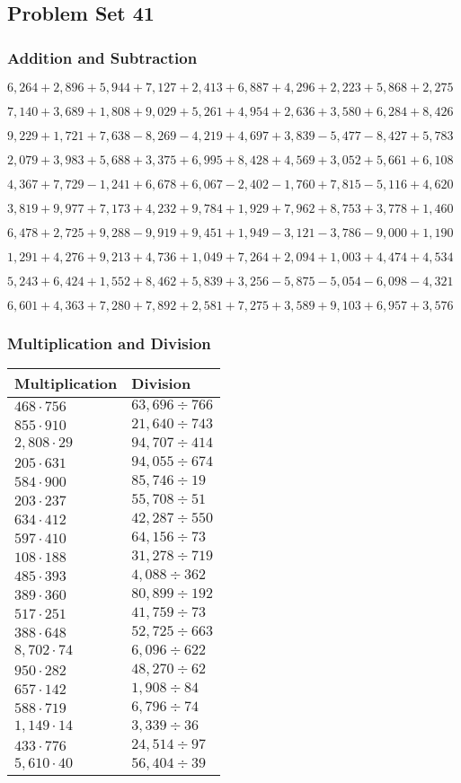\hypertarget{problem-set-41-3}{%
\subsection{Problem Set 41}\label{problem-set-41-3}}

\hypertarget{addition-and-subtraction-203}{%
\subsubsection{Addition and
Subtraction}\label{addition-and-subtraction-203}}

\(6,264+2,896+5,944+7,127+2,413+6,887+4,296+2,223+5,868+ 2,275\)

\(7,140+3,689+1,808+9,029+5,261+4,954+2,636+3,580+6,284+8,426\)

\(9,229+1,721+7,638-8,269-4,219+4,697+3,839-5,477-8,427+5,783\)

\(2,079+3,983+5,688+3,375+6,995+8,428+4,569+3,052+5,661+6,108\)

\(4,367+7,729-1,241+6,678+6,067-2,402-1,760+7,815-5,116+4,620\)

\(3,819+9,977+7,173+4,232+9,784+1,929+7,962+8,753+3,778+1,460\)

\(6,478+2,725+9,288-9,919+9,451+1,949-3,121-3,786-9,000+1,190\)

\(1,291+4,276+9,213+4,736+1,049+7,264+2,094+1,003+4,474+4,534\)

\(5,243+6,424+1,552+8,462+5,839+3,256-5,875-5,054-6,098-4,321\)

\(6,601+4,363+7,280+7,892+2,581+7,275+3,589+9,103+6,957+3,576\)

\hypertarget{multiplication-and-division-202}{%
\subsubsection{Multiplication and
Division}\label{multiplication-and-division-202}}

\begin{longtable}[]{@{}ll@{}}
\toprule
Multiplication & Division\tabularnewline
\midrule
\endhead
\(468\cdot756\) & \(63,696÷766\)\tabularnewline
\(855\cdot910\) & \(21,640÷743\)\tabularnewline
\(2,808\cdot29\) & \(94,707÷414\)\tabularnewline
\(205\cdot631\) & \(94,055÷674\)\tabularnewline
\(584\cdot900\) & \(85,746÷19\)\tabularnewline
\(203\cdot237\) & \(55,708÷51\)\tabularnewline
\(634\cdot412\) & \(42,287÷550\)\tabularnewline
\(597\cdot410\) & \(64,156÷73\)\tabularnewline
\(108\cdot188\) & \(31,278÷719\)\tabularnewline
\(485\cdot393\) & \(4,088÷362\)\tabularnewline
\(389\cdot360\) & \(80,899÷192\)\tabularnewline
\(517\cdot251\) & \(41,759÷73\)\tabularnewline
\(388\cdot648\) & \(52,725÷663\)\tabularnewline
\(8,702\cdot74\) & \(6,096÷622\)\tabularnewline
\(950\cdot282\) & \(48,270÷62\)\tabularnewline
\(657\cdot142\) & \(1,908÷84\)\tabularnewline
\(588\cdot719\) & \(6,796÷74\)\tabularnewline
\(1,149\cdot14\) & \(3,339÷36\)\tabularnewline
\(433\cdot776\) & \(24,514÷97\)\tabularnewline
\(5,610\cdot40\) & \(56,404÷39\)\tabularnewline
\bottomrule
\end{longtable}

